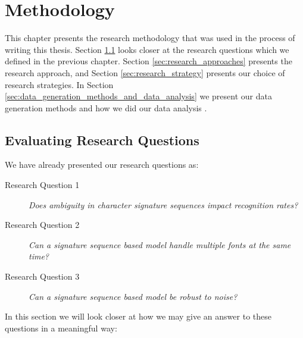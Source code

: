 
\chapter{Methodology}
\label{ch:methodology}
This chapter presents the research methodology that was used in the process of writing this thesis. Section \ref{sec:research_questions_and_approach} looks closer at the research questions which we defined in the previous chapter. Section \ref{sec:research_approaches} presents the research approach, and Section \ref{sec:research_strategy} presents our choice of research strategies. In Section \ref{sec:data_generation_methods_and_data_analysis} we present our data generation methods and how we did our data analysis .


\section{Evaluating Research Questions}
\label{sec:research_questions_and_approach}
We have already presented our research questions as:

\begin{description}
    \item[Research Question 1]{\textit{Does ambiguity in character signature sequences impact recognition rates?}}
    \item[Research Question 2]{\textit{Can a signature sequence based model handle multiple fonts at the same time?}}
    \item[Research Question 3]{\textit{Can a signature sequence based model be robust to noise?}}
\end{description}

\newpage
In this section we will look closer at how we may give an answer to these questions in a meaningful way:

